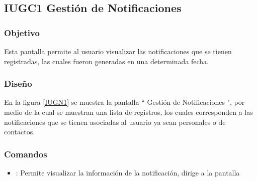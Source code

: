 \subsection{IUGC1 Gestión de Notificaciones}

\subsubsection{Objetivo}

	
    Esta pantalla permite al usuario visualizar  las notificaciones que se tienen registradas, las cuales fueron generadas en una determinada fecha.

\subsubsection{Diseño}


    En la figura \ref{IUGN1} se muestra la pantalla `` Gestión de Notificaciones ", por medio de la cual se muestran una lista de registros, los cuales corresponden a las notificaciones que se tienen asociadas al usuario ya sean personales o de contactos.\\


\subsubsection{Comandos}
    \begin{itemize}
    	\item \btnDetalle[Detalle]: Permite visualizar la información de la notificación, dirige a la pantalla 
    \end{itemize}

